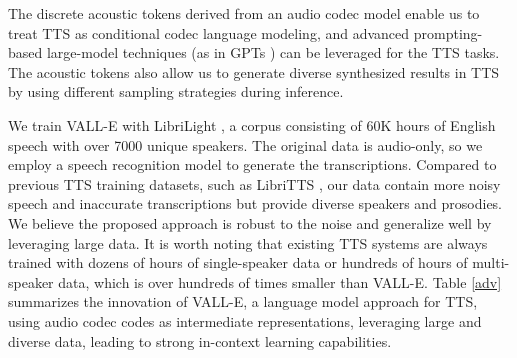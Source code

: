 \documentclass{article}
\theoremstyle{plain}
\theoremstyle{definition}
\theoremstyle{remark}
\newcommand\our{\textsc{VALL-E}}
\begin{document}
The discrete acoustic tokens  derived from an audio codec model  enable us to  treat TTS as conditional codec language modeling, and advanced prompting-based large-model techniques (as in GPTs \citep{DBLP:conf/nips/BrownMRSKDNSSAA20}) can be leveraged for the TTS tasks. The acoustic tokens also allow us to generate diverse synthesized results in TTS by using different sampling strategies during inference.


 We train \our{} with LibriLight \citep{kahn2020libri}, a corpus consisting of 60K hours of English speech with over 7000 unique speakers. The original data is audio-only, so we employ a speech recognition model to generate the transcriptions.  Compared to previous TTS training datasets, such as LibriTTS \citep{DBLP:conf/interspeech/ZenDCZWJCW19},  our data contain more noisy speech and inaccurate transcriptions but provide diverse speakers and prosodies. We believe the proposed approach is robust to the noise and generalize well by leveraging large data. It is worth noting that existing TTS systems are always trained with dozens of hours of single-speaker data or hundreds of hours of multi-speaker data, which is over hundreds of times smaller than \our{}. 
 Table \ref{adv} summarizes the innovation of \our{}, a  language model approach for TTS, using audio codec codes as intermediate representations,  leveraging large and diverse data, leading to strong in-context learning capabilities. 
\end{document}
